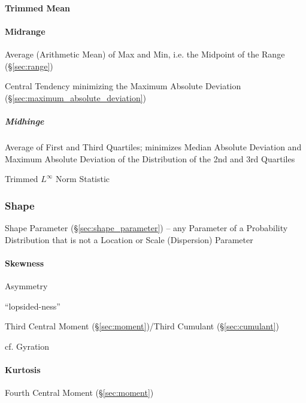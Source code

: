\paragraph{Trimmed Mean}\label{sec:trimmed_mean}\hfill



\paragraph{Midrange}\label{sec:midrange}\hfill

Average (Arithmetic Mean) of Max and Min, i.e. the Midpoint of the Range
(\S\ref{sec:range})

Central Tendency minimizing the Maximum Absolute Deviation
(\S\ref{sec:maximum_absolute_deviation})



\subparagraph{Midhinge}\label{sec:midhinge}\hfill

Average of First and Third Quartiles; minimizes Median Absolute Deviation and
Maximum Absolute Deviation of the Distribution of the 2nd and 3rd Quartiles

Trimmed $L^\infty$ Norm Statistic



\subsubsection{Shape}\label{sec:distribution_shape}

\fist Shape Parameter (\S\ref{sec:shape_parameter}) -- any Parameter of a
Probability Distribution that is not a Location or Scale (Dispersion) Parameter



\paragraph{Skewness}\label{sec:skewness}\hfill

Asymmetry %

``lopsided-ness''

Third Central Moment (\S\ref{sec:moment})/Third Cumulant (\S\ref{sec:cumulant})

cf. Gyration



\paragraph{Kurtosis}\label{sec:kurtosis}\hfill

Fourth Central Moment (\S\ref{sec:moment})

